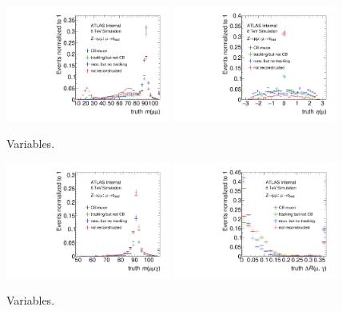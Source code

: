 \begin{figure}[tp]
  \centering
  \includegraphics[width=0.48\textwidth]{figures/tauperformance/muonfakes_mll}
  \includegraphics[width=0.48\textwidth]{figures/tauperformance/muonfakes_eta}
  \caption{Variables.}
  \label{fig:taus-muonfakes1}
\end{figure}

\begin{figure}[tp]
  \centering
  \includegraphics[width=0.48\textwidth]{figures/tauperformance/muonfakes_mlly}
  \includegraphics[width=0.48\textwidth]{figures/tauperformance/muonfakes_dR}
  \caption{Variables.}
  \label{fig:taus-muonfakes2}
\end{figure}

